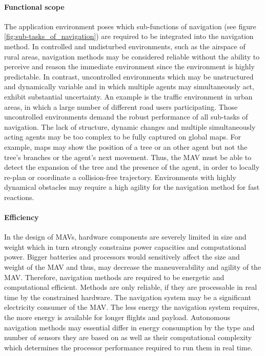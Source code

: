 \paragraph{Functional scope}
The application environment poses which sub-functions of navigation (see figure \ref{fig:sub-tasks_of_navigation}) 
are required to be integrated into the navigation method.
In controlled and undisturbed environments, such as the airspace of rural areas,
navigation methods may be considered reliable without the ability to perceive and reason the immediate environment
since the environment is highly predictable.
In contrast, uncontrolled environments which may be unstructured and dynamically variable and 
in which multiple agents may simultaneously act, exhibit substantial uncertainty.
An example is the traffic environment in urban areas, in which a large number of different road users participating. 
Those uncontrolled environments demand the robust performance of all sub-tasks of navigation.
The lack of structure, dynamic changes and multiple simultaneously acting agents
may be too complex to be fully captured on global maps.
For example, maps may show the position of a tree or an other agent but not the tree's branches or the agent's next movement.
Thus, the MAV must be able to detect the expansion of the tree and the presence of the agent,
in order to locally re-plan or coordinate a collision-free trajectory.
Environments with highly dynamical obstacles may require a high agility for
the navigation method for fast reactions.


\paragraph{Efficiency}
In the design of MAVs, hardware components are severely limited in size and weight
which in turn strongly constrains power capacities and computational power.
Bigger batteries and processors would sensitively affect the size and weight of the MAV 
and thus, may decrease the maneuverability and agility of the MAV. \cite{Verbeke2017}
Therefore, navigation methods are required to be energetic and computational efficient.
Methods are only reliable, if they are processable in real time by the constrained hardware.
The navigation system may be a significant electricity consumer of the MAV.
The less energy the navigation system requires, the more energy is available for longer flights and payload.
Autonomous navigation methods may essential differ in energy consumption by the type and number of sensors they are based on
as well as their computational complexity which determines the processor performance required to run them in real time. \cite{Chao2010}


